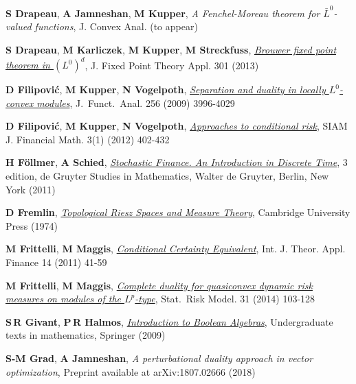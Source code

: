 \documentclass{jloganal}
\numberwithin{equation}{section}
\theoremstyle{plain}
\begin{document}
\begin{thebibliography}{}
\textbf{S Drapeau}, \textbf{A Jamneshan}, \textbf{M Kupper}, \emph{{A
  Fenchel-Moreau theorem for $\bar L^0$-valued functions}}, J. Convex Anal.
  (to appear)

\textbf{S Drapeau}, \textbf{M Karliczek}, \textbf{M Kupper}, \textbf{M
  Streckfuss}, \href{http://dx.doi.org/10.1186/1687-1812-2013-301}
  {\emph{{Brouwer fixed point theorem in $(L^0)^d$}}}, J. Fixed Point Theory
  Appl. 301 (2013)

\textbf{D Filipovi{\'c}}, \textbf{M Kupper}, \textbf{N Vogelpoth},
  \href{http://dx.doi.org/10.1016/j.jfa.2008.11.015} {\emph{{Separation and
  duality in locally $L^0$-convex modules}}}, J.~Funct.~Anal. 256 (2009)
  3996-4029

\textbf{D Filipovi{\'c}}, \textbf{M Kupper}, \textbf{N Vogelpoth},
  \href{http://dx.doi.org/10.1137/090773076} {\emph{{Approaches to conditional
  risk}}}, SIAM J. Financial Math. 3(1) (2012) 402-432

\textbf{H F\"{o}llmer}, \textbf{A Schied},
  \href{http://dx.doi.org/10.1515/9783110218053} {\emph{{Stochastic Finance. An
  Introduction in Discrete Time}}}, 3 edition, de Gruyter Studies in
  Mathematics, Walter de Gruyter, Berlin, New York (2011)

\textbf{D Fremlin}, \href{http://dx.doi.org/10.1017/CBO9780511897207}
  {\emph{Topological Riesz Spaces and Measure Theory}}, Cambridge University
  Press (1974)

\textbf{M Frittelli}, \textbf{M Maggis},
  \href{http://dx.doi.org/10.1142/S0219024911006255} {\emph{{Conditional
  Certainty Equivalent}}}, Int. J. Theor. Appl. Finance 14 (2011) 41-59

\textbf{M Frittelli}, \textbf{M Maggis},
  \href{http://dx.doi.org/10.1515/strm-2013-1163} {\emph{{Complete duality for
  quasiconvex dynamic risk measures on modules of the $L^{p}$-type}}},
  Stat.~Risk Model. 31 (2014) 103-128

\textbf{S\,R Givant}, \textbf{P\,R Halmos},
  \href{http://dx.doi.org/10.1007/978-0-387-68436-9} {\emph{Introduction to
  Boolean Algebras}}, Undergraduate texts in mathematics, Springer (2009)

\textbf{S-M Grad}, \textbf{A Jamneshan}, \emph{{A perturbational duality
  approach in vector optimization}}, Preprint available at arXiv:1807.02666
  (2018)


\end{thebibliography}
\end{document}

